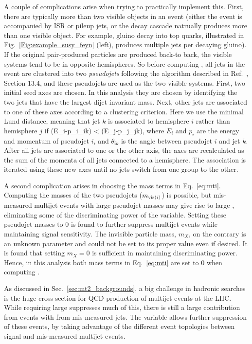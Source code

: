 A couple of complications arise when trying to practically implement this. First, there are typically more than two visible objects
in an event (either the event is accompanied by ISR or pileup jets, or the decay cascade natrually produces more than one visible
object. For example, gluino decay into top quarks, illustrated in Fig.~\ref{Fig:example_susy_feyn} (left), produces multiple jets per
decaying gluino). If the original pair-produced particles are produced back-to back, the visible systems tend to be in opposite
hemispheres. So before computing \mttwo, all jets in the event are clustered into two \emph{pseudojets} following the algorithm
described in Ref.~\cite{CMS:tdr}, Section 13.4, and these pseudojets are used as the two visible systems. 
First, two initial seed axes are chosen. In this analysis they are chosen
by identifying the two jets that have the largest dijet invariant mass. Next, other jets are associated to one of these axes
according to a clustering criterion. Here we use the minimal Lund distance, meaning that jet $k$ is associated to hemisphere
$i$ rather than hemisphere $j$ if
\be
(E_i-p_i\cos\theta_{ik}) < (E_j-p_j\cos\theta_{jk}),
\ee
where $E_i$ and $p_i$ are the energy and momentum of pseudojet $i$, and $\theta_{ik}$ is the angle between pseudojet $i$ and jet $k$.
After all jets are associated to one or the other axis, the axes are recalculated as the sum of the
momenta of all jets connected to a hemisphere. The association is iterated using these new axes
until no jets switch from one group to the other.

A second complication arises in choosing the mass terms in Eq.~\ref{eq:mti}. Computing the masses of
the two pseudojets ($m_{\mathrm{vis}(i)}$) is possible, but mis-measured multijet events with large pseudojet masses
may give rise to large \mttwo, eliminating some of the discriminating power of the variable. Setting
these pseudojet masses to 0 is found to further suppress multijet events while maintaining signal sensitivity.
The invisible particle mass, $m_X$, on the contrary is an unknown parameter and could not be set to its
proper value even if desired. It is found that setting $m_X=0$ is sufficient in maintaining discriminating power.
Hence, in this analysis both mass terms in Eq.~\ref{eq:mti} are set to 0 when computing \mttwo.

As discussed in Sec.~\ref{sec:mt2_backgrounds}, a big challenge in hadronic searches is the huge cross section
for QCD production of multijet events at the LHC. While requiring large \ptmiss suppresses much of this, there is still
a large contribution from events with \ptmiss from mis-measured jets. The \mttwo variable allows further suppression
of these events, by taking advantage of the different event topologies between signal and mis-measured multijet events.

